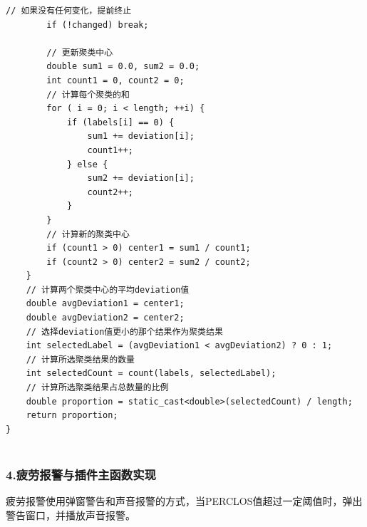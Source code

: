 \documentclass[12pt,hyperref,a4paper,UTF8]{ctexart}
\begin{document}
\begin{lstlisting}[caption={kmeans算法}, label={lst:example}]
        // 如果没有任何变化，提前终止
        if (!changed) break;

        // 更新聚类中心
        double sum1 = 0.0, sum2 = 0.0;
        int count1 = 0, count2 = 0;
        // 计算每个聚类的和
        for ( i = 0; i < length; ++i) {
            if (labels[i] == 0) {
                sum1 += deviation[i];
                count1++;
            } else {
                sum2 += deviation[i];
                count2++;
            }
        }
        // 计算新的聚类中心
        if (count1 > 0) center1 = sum1 / count1;
        if (count2 > 0) center2 = sum2 / count2;
    }
    // 计算两个聚类中心的平均deviation值
    double avgDeviation1 = center1;
    double avgDeviation2 = center2;
    // 选择deviation值更小的那个结果作为聚类结果
    int selectedLabel = (avgDeviation1 < avgDeviation2) ? 0 : 1;
    // 计算所选聚类结果的数量
    int selectedCount = count(labels, selectedLabel);
    // 计算所选聚类结果占总数量的比例
    double proportion = static_cast<double>(selectedCount) / length;
    return proportion;
}


        \end{lstlisting}
            

        \subsubsection*{\large \textbf{4.疲劳报警与插件主函数实现}}
        
        疲劳报警使用弹窗警告和声音报警的方式，当PERCLOS值超过一定阈值时，弹出警告窗口，并播放声音报警。
\end{document}
